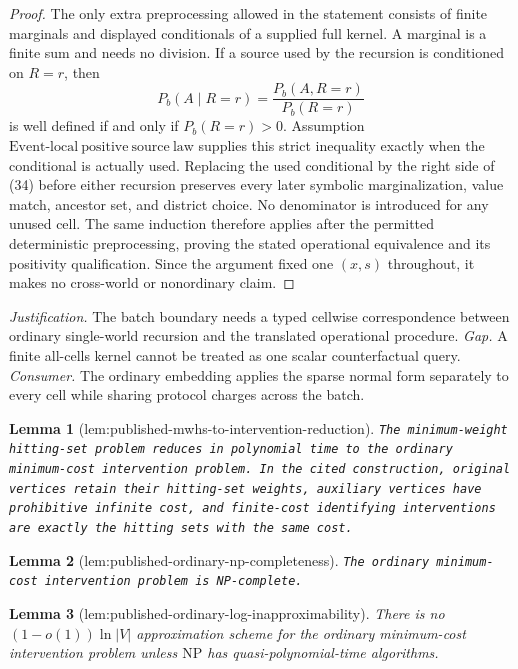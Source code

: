 \documentclass{article}
\newtheorem{lemma}{Lemma}
\begin{document}
\begin{proof}
The only extra preprocessing allowed in the statement consists of finite marginals and displayed conditionals of a supplied full kernel.  A marginal is a finite sum and needs no division.  If a source used by the recursion is conditioned on \(R=r\), then
\[
 P_b(A\mid R=r)
 =\frac{P_b(A,R=r)}{P_b(R=r)}
 \tag{34}
\]
is well defined if and only if \(P_b(R=r)>0\).  Assumption~\(\mathrm{Event\mbox{-}local\ positive\ source\ law}\) supplies this strict inequality exactly when the conditional is actually used.  Replacing the used conditional by the right side of (34) before either recursion preserves every later symbolic marginalization, value match, ancestor set, and district choice.  No denominator is introduced for any unused cell.  The same induction therefore applies after the permitted deterministic preprocessing, proving the stated operational equivalence and its positivity qualification.  Since the argument fixed one \((x,s)\) throughout, it makes no cross-world or nonordinary claim.
\end{proof}
\par\smallskip\noindent \textit{Justification.} The batch boundary needs a typed cellwise correspondence between ordinary single-world recursion and the translated operational procedure. \textit{Gap.} A finite all-cells kernel cannot be treated as one scalar counterfactual query. \textit{Consumer.} The ordinary embedding applies the sparse normal form separately to every cell while sharing protocol charges across the batch.

\begin{lemma}[lem:published-mwhs-to-intervention-reduction]\label{lem:published-mwhs-to-intervention-reduction}
\texttt{The minimum-\allowbreak{}weight hitting-\allowbreak{}set problem reduces in polynomial time to the ordinary minimum-\allowbreak{}cost intervention problem.  In the cited construction,\allowbreak{} original vertices retain their hitting-\allowbreak{}set weights,\allowbreak{} auxiliary vertices have prohibitive infinite cost,\allowbreak{} and finite-\allowbreak{}cost identifying interventions are exactly the hitting sets with the same cost.}
\end{lemma}

\begin{lemma}[lem:published-ordinary-np-completeness]\label{lem:published-ordinary-np-completeness}
\texttt{The ordinary minimum-\allowbreak{}cost intervention problem is NP-\allowbreak{}complete.}
\end{lemma}

\begin{lemma}[lem:published-ordinary-log-inapproximability]\label{lem:published-ordinary-log-inapproximability}
There is no \((1-o(1))\ln|V|\) approximation scheme for the ordinary minimum-cost intervention problem unless \(\mathrm{NP}\) has quasi-polynomial-time algorithms.
\end{lemma}
\end{document}

